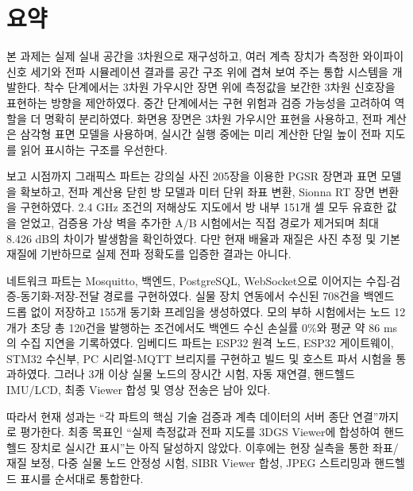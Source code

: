 \documentclass[titlepage]{pnureport}
\begin{document}
\hypersetup{pageanchor=false}
\maketitle

\hypersetup{pageanchor=true}
\tableofcontents
\clearpage
\listoffigures
\clearpage
\listoftables
\clearpage

\chapter*{요약}

본 과제는 실제 실내 공간을 3차원으로 재구성하고, 여러 계측 장치가 측정한 와이파이 신호 세기와 전파 시뮬레이션 결과를 공간 구조 위에 겹쳐 보여 주는 통합 시스템을 개발한다. 착수 단계에서는 3차원 가우시안 장면 위에 측정값을 보간한 3차원 신호장을 표현하는 방향을 제안하였다. 중간 단계에서는 구현 위험과 검증 가능성을 고려하여 역할을 더 명확히 분리하였다. 화면용 장면은 3차원 가우시안 표현을 사용하고, 전파 계산은 삼각형 표면 모델을 사용하며, 실시간 실행 중에는 미리 계산한 단일 높이 전파 지도를 읽어 표시하는 구조를 우선한다.

보고 시점까지 그래픽스 파트는 강의실 사진 205장을 이용한 PGSR 장면과 표면 모델을 확보하고, 전파 계산용 닫힌 방 모델과 미터 단위 좌표 변환, Sionna RT 장면 변환을 구현하였다. 2.4 GHz 조건의 저해상도 지도에서 방 내부 151개 셀 모두 유효한 값을 얻었고, 검증용 가상 벽을 추가한 A/B 시험에서는 직접 경로가 제거되며 최대 8.426 dB의 차이가 발생함을 확인하였다. 다만 현재 배율과 재질은 사진 추정 및 기본 재질에 기반하므로 실제 전파 정확도를 입증한 결과는 아니다.

네트워크 파트는 Mosquitto, 백엔드, PostgreSQL, WebSocket으로 이어지는 수집-검증-동기화-저장-전달 경로를 구현하였다. 실물 장치 연동에서 수신된 708건을 백엔드 드롭 없이 저장하고 155개 동기화 프레임을 생성하였다. 모의 부하 시험에서는 노드 12개가 초당 총 120건을 발행하는 조건에서도 백엔드 수신 손실률 0\%와 평균 약 86 ms의 수집 지연을 기록하였다. 임베디드 파트는 ESP32 원격 노드, ESP32 게이트웨이, STM32 수신부, PC 시리얼-MQTT 브리지를 구현하고 빌드 및 호스트 파서 시험을 통과하였다. 그러나 3개 이상 실물 노드의 장시간 시험, 자동 재연결, 핸드헬드 IMU/LCD, 최종 Viewer 합성 및 영상 전송은 남아 있다.

따라서 현재 성과는 ``각 파트의 핵심 기술 검증과 계측 데이터의 서버 종단 연결''까지로 평가한다. 최종 목표인 ``실제 측정값과 전파 지도를 3DGS Viewer에 합성하여 핸드헬드 장치로 실시간 표시''는 아직 달성하지 않았다. 이후에는 현장 실측을 통한 좌표/재질 보정, 다중 실물 노드 안정성 시험, SIBR Viewer 합성, JPEG 스트리밍과 핸드헬드 표시를 순서대로 통합한다.
\end{document}

